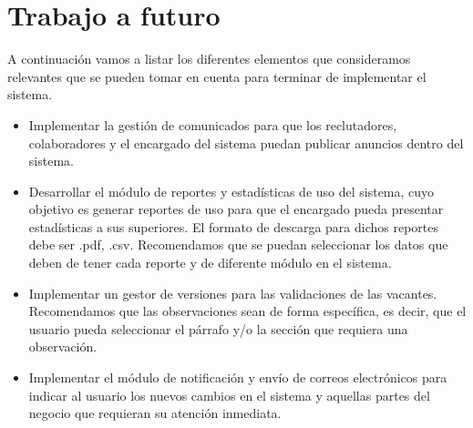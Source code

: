 \section{Trabajo a futuro} 
A continuación vamos a listar los diferentes elementos que consideramos relevantes que se pueden tomar en cuenta para terminar de implementar el sistema.
\begin{itemize}
	\item Implementar la gestión de comunicados para que los reclutadores, colaboradores y el encargado del sistema puedan publicar anuncios dentro del sistema.
	\item Desarrollar el módulo de reportes y estadísticas de uso del sistema, cuyo objetivo es generar reportes de uso para que el encargado pueda presentar estadísticas  a sus superiores. El formato de descarga para dichos reportes debe ser .pdf, .csv. Recomendamos que se puedan seleccionar los datos que deben de tener cada reporte y de diferente módulo en el sistema.
	\item Implementar un gestor de versiones para las validaciones de las vacantes. Recomendamos que las observaciones sean de forma específica, es decir, que el usuario pueda seleccionar el párrafo y/o la sección que requiera una observación.
	\item Implementar el módulo de notificación y envío de correos electrónicos para indicar al usuario los nuevos cambios en el sistema y aquellas partes del negocio que requieran su atención inmediata. 
\end{itemize}

